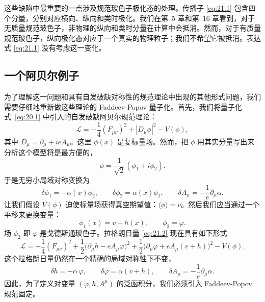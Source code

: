 这些缺陷中最重要的一点涉及规范玻色子极化态的处理。传播子 \eqref{eq:21.1} 包含四个分量，分别对应横向、纵向和类时极化。我们在第~5 章和第~16 章看到，对于无质量规范玻色子，非物理的纵向和类时分量在计算中会抵消。然而，对于有质量规范玻色子，纵向极化态对应于一个真实的物理粒子；我们不希望它被抵消。表达式 \eqref{eq:21.1} 没有考虑这一变化。

\subsection{一个阿贝尔例子}

为了理解这一问题和具有自发破缺对称性的规范理论中出现的其他形式问题，我们需要仔细地重新做这些理论的 Faddeev-Popov 量子化。首先，我们将量子化式~\eqref{eq:20.1} 中引入的自发破缺阿贝尔规范理论：
\begin{equation}
  \mathcal{L} = -\frac{1}{4}(F_{\mu\nu})^2 + |D_\mu\phi|^2 - V(\phi) ,
  \label{eq:21.2}
\end{equation}
其中 $D_\mu = \partial_\mu + ieA_\mu$。这里 $\phi(x)$ 是复标量场。然而，把 $\phi$ 用其实分量写出来分析这个模型将是最方便的，
\begin{equation}
  \phi = \frac{1}{\sqrt{2}}(\phi_1 + i\phi_2) .
  \label{eq:21.3}
\end{equation}
于是无穷小局域对称变换为
\begin{equation}
  \delta\phi_1 = -\alpha(x)\phi_2,\qquad \delta\phi_2 = \alpha(x)\phi_1,\qquad
  \delta A_\mu = -\frac{1}{e}\partial_\mu\alpha .
  \label{eq:21.4}
\end{equation}
让我们假设 $V(\phi)$ 迫使标量场获得真空期望值：$\langle\phi\rangle = v$。然后我们应当通过一个平移来更换变量：
\begin{equation}
  \phi_1(x) = v + h(x);\qquad \phi_2 = \varphi .
  \label{eq:21.5}
\end{equation}
场 $\phi_2$ 即 $\varphi$ 是戈德斯通玻色子。拉格朗日量 \eqref{eq:21.2} 现在具有如下形式
\begin{equation}
  \mathcal{L} = -\frac{1}{4}(F_{\mu\nu})^2
    + \frac{1}{2}\bigl( \partial_\mu h - eA_\mu\varphi \bigr)^2
    + \frac{1}{2}\bigl( \partial_\mu\varphi + eA_\mu(v+h) \bigr)^2
    - V(\phi) .
  \label{eq:21.6}
\end{equation}
这个拉格朗日量仍然在一个精确的局域对称性下不变，
\begin{equation}
  \delta h = -\alpha\,\varphi,\qquad \delta\varphi = \alpha(v+h),\qquad
  \delta A_\mu = -\frac{1}{e}\partial_\mu\alpha .
  \label{eq:21.7}
\end{equation}
因此，为了定义对变量 $(\varphi, h, A^\mu)$ 的泛函积分，我们必须引入 Faddeev-Popov 规范固定。

